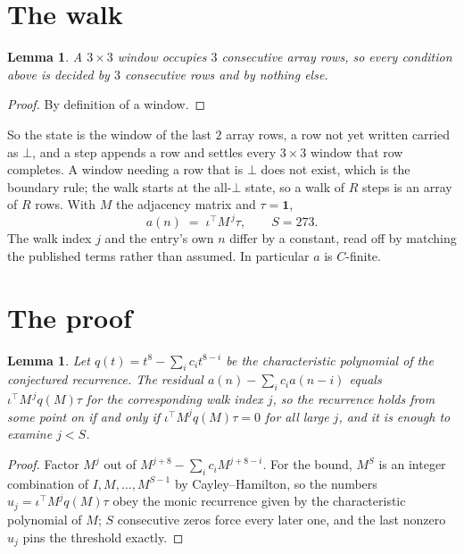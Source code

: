 \documentclass[11pt,a4paper]{article}
\theoremstyle{plain}
\newtheorem{lemma}[theorem]{Lemma}
\theoremstyle{definition}
\begin{document}
\section{The walk}

\begin{lemma}\label{lem:win}
A $3\times3$ window occupies $3$ consecutive array rows, so every condition above is
decided by $3$ consecutive rows and by nothing else.
\end{lemma}

\begin{proof}
By definition of a window.
\end{proof}

So the state is the window of the last $2$ array rows, a row not yet written carried as
$\bot$, and a step appends a row and settles every $3\times3$ window that row completes. A
window needing a row that is $\bot$ does not exist, which is the boundary rule; the walk starts
at the all-$\bot$ state, so a walk of $R$ steps is an array of $R$ rows. With $M$ the adjacency
matrix and $\tau=\mathbf{1}$,
\[
a(n)\;=\;\iota^{\!\top}M^{\,j}\tau ,\qquad S=273.
\]
The walk index $j$ and the entry's own $n$ differ by a constant, read off by matching the
published terms rather than assumed. In particular $a$ is $C$-finite.

\section{The proof}

\begin{lemma}\label{lem:crit}
Let $q(t)=t^{8}-\sum_i c_it^{8-i}$ be the characteristic polynomial of the
conjectured recurrence. The residual $a(n)-\sum_ic_ia(n-i)$ equals
$\iota^{\!\top}M^{\,j}q(M)\tau$ for the corresponding walk index $j$, so the recurrence
holds from some point on if and only if $\iota^{\!\top}M^{j}q(M)\tau=0$ for all large $j$,
and it is enough to examine $j<S$.
\end{lemma}

\begin{proof}
Factor $M^{j}$ out of $M^{j+8}-\sum_ic_iM^{j+8-i}$. For the bound, $M^{S}$
is an integer combination of $I,M,\dots,M^{S-1}$ by Cayley--Hamilton, so the numbers
$u_j=\iota^{\!\top}M^{j}q(M)\tau$ obey the monic recurrence given by the characteristic
polynomial of $M$; $S$ consecutive zeros force every later one, and the last nonzero $u_j$
pins the threshold exactly.
\end{proof}
\end{document}
